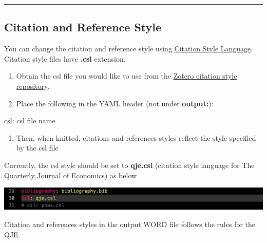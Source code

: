 \documentclass[
  letterpaper,
  DIV=11,
  numbers=noendperiod]{scrreprt}
\newenvironment{Shaded}{\begin{snugshade}}{\end{snugshade}}
\newcommand{\NormalTok}[1]{\textcolor[rgb]{0.00,0.23,0.31}{#1}}
\newcommand{\SpecialCharTok}[1]{\textcolor[rgb]{0.37,0.37,0.37}{#1}}
\providecommand{\tightlist}{%
  \setlength{\itemsep}{0pt}\setlength{\parskip}{0pt}}\usepackage{longtable,booktabs,array}
\begin{document}
\begin{center}\rule{0.5\linewidth}{0.5pt}\end{center}

\hypertarget{citation-and-reference-style}{%
\subsection{Citation and Reference
Style}\label{citation-and-reference-style}}

You can change the citation and reference style using
\href{https://citationstyles.org/}{Citation Style Language}. Citation
style files have \textbf{.csl} extension.

\begin{enumerate}
\def\labelenumi{\arabic{enumi}.}
\item
  Obtain the csl file you would like to use from the
  \href{https://www.zotero.org/styles}{Zotero citation style
  repository}.
\item
  Place the following in the YAML header (not under \textbf{output:}):
\end{enumerate}

\begin{Shaded}
\begin{Highlighting}[]
\NormalTok{csl}\SpecialCharTok{:}\NormalTok{ csl file name }
\end{Highlighting}
\end{Shaded}

\begin{enumerate}
\def\labelenumi{\arabic{enumi}.}
\setcounter{enumi}{2}
\tightlist
\item
  Then, when knitted, citations and references styles reflect the style
  specified by the csl file
\end{enumerate}

Currently, the csl style should be set to \textbf{qje.csl} (citation
style language for The Quarterly Journal of Economics) as below

\includegraphics[width=1\textwidth,height=\textheight]{assets/pictures/yaml-csl.png}

Citation and references styles in the output WORD file follows the rules
for the QJE.
\end{document}
